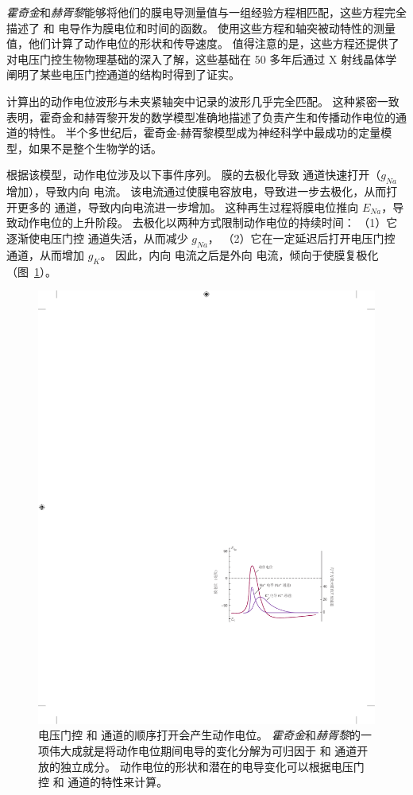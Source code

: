 \textit{霍奇金}和\textit{赫胥黎}能够将他们的膜电导测量值与一组经验方程相匹配，这些方程完全描述了  和  电导作为膜电位和时间的函数。
使用这些方程和轴突被动特性的测量值，他们计算了动作电位的形状和传导速度。
值得注意的是，这些方程还提供了对电压门控生物物理基础的深入了解，这些基础在 50 多年后通过 X 射线晶体学阐明了某些电压门控通道的结构时得到了证实。


计算出的动作电位波形与未夹紧轴突中记录的波形几乎完全匹配。
这种紧密一致表明，霍奇金和赫胥黎开发的数学模型准确地描述了负责产生和传播动作电位的通道的特性。
半个多世纪后，霍奇金-赫胥黎模型成为神经科学中最成功的定量模型，如果不是整个生物学的话。


根据该模型，动作电位涉及以下事件序列。
膜的去极化导致  通道快速打开（$g_{Na}$ 增加），导致内向  电流。
该电流通过使膜电容放电，导致进一步去极化，从而打开更多的  通道，导致内向电流进一步增加。 
这种再生过程将膜电位推向 $E_{Na}$，导致动作电位的上升阶段。
去极化以两种方式限制动作电位的持续时间：
（1）它逐渐使电压门控  通道失活，从而减少 $g_{Na}$，
（2）它在一定延迟后打开电压门控  通道，从而增加 $g_K$。
因此，内向  电流之后是外向  电流，倾向于使膜复极化（图~\ref{fig:10_7}）。


\begin{figure}[htbp]
	\centering
	\includegraphics[width=0.65\linewidth]{chap10/fig_10_7}
	\caption{电压门控  和  通道的顺序打开会产生动作电位。
		\textit{霍奇金}和\textit{赫胥黎}的一项伟大成就是将动作电位期间电导的变化分解为可归因于  和  通道开放的独立成分。
		动作电位的形状和潜在的电导变化可以根据电压门控  和  通道的特性来计算\cite{hille1978ionic}。}
	\label{fig:10_7}
\end{figure}


